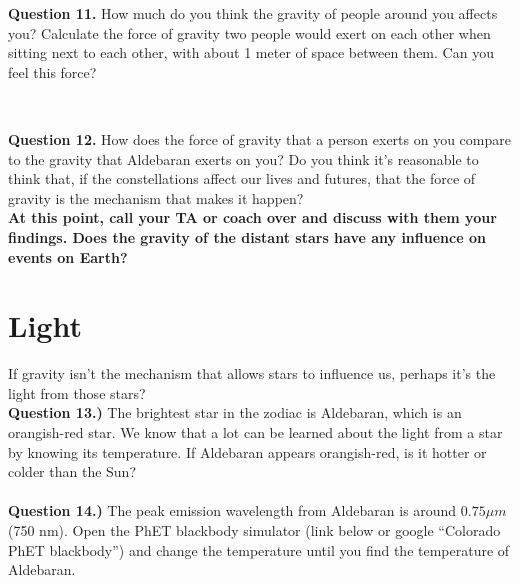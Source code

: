 \documentclass[11pt]{article}
\begin{document}
\textbf{Question 11.} How much do you think the gravity of people around you affects you? Calculate the force of gravity two people would exert on each other when sitting next to each other, with about 1 meter of space between them. Can you feel this force?
\vspace{1em}


\vspace{2.5cm}
\hrulefill\\
\vspace{2em}

\newpage
\textbf{Question 12.} How does the force of gravity that a person exerts on you compare to the gravity that Aldebaran exerts on you? Do you think it's reasonable to think that, if the constellations affect our lives and futures, that the force of gravity is the mechanism that makes it happen? \\
%

\bf At this point, call your TA or coach over and discuss with them your findings. Does the gravity of the distant stars have any influence on events on Earth?

\rm 

\newpage

\section{Light}
If gravity isn't the mechanism that allows stars to influence us, perhaps it's the light from those stars?\\

\textbf{Question 13.)} The brightest star in the zodiac is Aldebaran, which is an orangish-red star. We know that a lot can be learned about the light from a star by knowing its temperature. If Aldebaran appears orangish-red, is it hotter or colder than the Sun?\\

\vspace{1.5cm}
\hrulefill\\

\textbf{Question 14.)} The peak emission wavelength from Aldebaran is around $0.75\mu m$ (750 nm). Open the PhET blackbody simulator (link below or google ``Colorado PhET blackbody'') and change the temperature until you find the temperature of Aldebaran.
\end{document}
